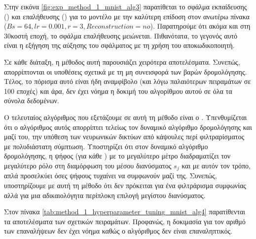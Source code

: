 Στην εικόνα \ref{fig:exp_method_1_mnist_alg3} παρατίθεται το σφάλμα εκπαίδευσης () και επαλήθευσης () για το μοντέλο με την καλύτερη επίδοση στον ανωτέρω πίνακα ($Bs = 64, lr = 0.001, r = 3, Reconstruction = no$). Παρατηρούμε ότι ακόμα και στη 30κοστή εποχή, το σφάλμα επαλήθευσης μειώνεται. Πιθανότατα, το γεγονός αυτό είναι η εξήγηση της αύξησης του σφάλματος με τη χρήση του αποκωδικοποιητή.\par

Σε κάθε διάταξη, η μέθοδος αυτή παρουσιάζει χειρότερα αποτελέσματα. Συνεπώς, απορρίπτονται οι υποθέσεις σχετικά με τη μη συνεισφορά των βαρών δρομολόγησης. Τέλος, το πόρισμα αυτό είναι ήδη αναμφίβολο (και λόγω παλαιότερων πειραμάτων σε 100 εποχές) και άρα, δεν έχει νόημα η δοκιμή του αλγορίθμου αυτού σε όλα τα σύνολα δεδομένων.\par

Ο τελευταίος αλγόριθμος που εξετάζουμε σε αυτή τη μέθοδο είναι ο . Υπενθυμίζεται ότι ο αλγόριθμος αυτός απορρίπτει τελείως τον δυναμικό αλγόριθμο δρομολόγησης και μαζί του, την υπόθεση των νευρωνικών δικτύων από κάψουλες περί φιλτραρίσματος με πολυδιάστατη σύμπτωση. Υποστηρίζει ότι στον δυναμικό αλγόριθμο δρομολόγησης, η ψήφος (για κάθε ) με το μεγαλύτερο μέτρο διαδραματίζει τον μεγαλύτερο ρόλο στη διαμόρφωση του μέσου διανύσματος $s_j$ και με αυτόν τον τρόπο, απλά προσελκύει όσες ψήφους τυχαίνει να συμφωνούν μαζί της. Συνεπώς, υποστηρίζουμε με αυτή τη μέθοδο ότι δεν πρόκειται για ένα φιλτράρισμα συμφωνίας αλλά για μια αδικαιολόγητα περίπλοκη επιλογή μεγίστου διανύσματος.\par

Στον πίνακα \ref{tab:method_1_hyperparameter_tuning_mnist_alg4} παρατίθενται τα αποτελέσματα των σχετικών πειραμάτων. Προφανώς, η δοκιμασία για τον αριθμό των επαναλήψεων δεν έχει νόημα καθώς ο αλγόριθμος δεν είναι επαναληπτικός.

